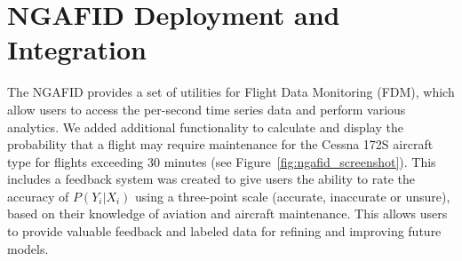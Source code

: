 \documentclass[letterpaper]{article} %
\newcommand{\travis}[1]{\textcolor{red}{{\it [Travis: #1]}}}
\newcommand{\hong}[1]{\textcolor{orange}{{\it [Hong: #1]}}}
\begin{document}
\section{NGAFID Deployment and Integration}









The NGAFID provides a set of utilities for Flight Data Monitoring (FDM), which allow users to access the per-second time series data and perform various analytics. We added additional functionality to calculate and display the probability that a flight may require maintenance for the Cessna 172S aircraft type for flights exceeding 30 minutes (see Figure~\ref{fig:ngafid_screenshot}). This includes a feedback system was created to give users the ability to rate the accuracy of $P(Y_i|X_i)$ using a three-point scale (accurate, inaccurate or unsure), based on their knowledge of aviation and aircraft maintenance. This allows users to provide valuable feedback and labeled data for refining and improving future models. 
\end{document}
